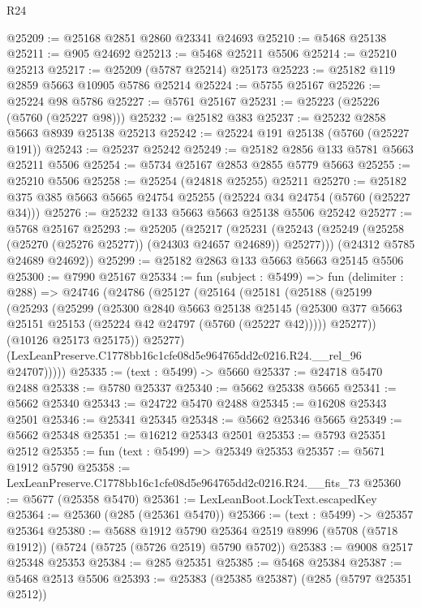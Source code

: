 \begin{lexlean}{R24}
\begin{coremodule}
@25209 := @25168 @2851 @2860 @23341 @24693
@25210 := @5468 @25138
@25211 := @905 @24692
@25213 := @5468 @25211 @5506
@25214 := @25210 @25213
@25217 := @25209 (@5787 @25214) @25173
@25223 := @25182 @119 @2859 @5663 @10905 @5786 @25214
@25224 := @5755 @25167
@25226 := @25224 @98 @5786
@25227 := @5761 @25167
@25231 := @25223 (@25226 (@5760 (@25227 @98)))
@25232 := @25182 @383
@25237 := @25232 @2858 @5663 @8939 @25138 @25213
@25242 := @25224 @191 @25138 (@5760 (@25227 @191))
@25243 := @25237 @25242
@25249 := @25182 @2856 @133 @5781 @5663 @25211 @5506
@25254 := @5734 @25167 @2853 @2855 @5779 @5663
@25255 := @25210 @5506
@25258 := @25254 (@24818 @25255) @25211
@25270 := @25182 @375 @385 @5663 @5665 @24754 @25255 (@25224 @34 @24754 (@5760 (@25227 @34)))
@25276 := @25232 @133 @5663 @5663 @25138 @5506 @25242
@25277 := @5768 @25167
@25293 := @25205
    (@25217
      (@25231 (@25243 (@25249 (@25258 (@25270 (@25276 @25277)) (@24303 @24657 @24689)) @25277)))
      (@24312 @5785 @24689 @24692))
@25299 := @25182 @2863 @133 @5663 @5663 @25145 @5506
@25300 := @7990 @25167
@25334 := fun (subject : @5499) =>
  fun (delimiter : @288) =>
  @24746
    (@24786
      (@25127
        (@25164
          (@25181
            (@25188
              (@25199
                (@25293
                  (@25299
                    (@25300
                      @2840
                      @5663
                      @25138
                      @25145
                      (@25300 @377 @5663 @25151 @25153 (@25224 @42 @24797 (@5760 (@25227 @42)))))
                    @25277))
                (@10126 @25173 @25175))
              @25277)
            (LexLeanPreserve.C1778bb16c1cfe08d5e964765dd2c0216.R24.__rel_96 @24707)))))
@25335 := (text : @5499) -> @5660
@25337 := @24718 @5470 @2488
@25338 := @5780 @25337
@25340 := @5662 @25338 @5665
@25341 := @5662 @25340
@25343 := @24722 @5470 @2488
@25345 := @16208 @25343 @2501
@25346 := @25341 @25345
@25348 := @5662 @25346 @5665
@25349 := @5662 @25348
@25351 := @16212 @25343 @2501
@25353 := @5793 @25351 @2512
@25355 := fun (text : @5499) => @25349 @25353
@25357 := @5671 @1912 @5790
@25358 := LexLeanPreserve.C1778bb16c1cfe08d5e964765dd2c0216.R24.__fits_73
@25360 := @5677 (@25358 @5470)
@25361 := LexLeanBoot.LockText.escapedKey
@25364 := @25360 (@285 (@25361 @5470))
@25366 := (text : @5499) -> @25357 @25364
@25380 := @5688
    @1912
    @5790
    @25364
    @2519
    @8996
    (@5708 (@5718 @1912))
    (@5724 (@5725 (@5726 @2519) @5790 @5702))
@25383 := @9008 @2517 @25348 @25353
@25384 := @285 @25351
@25385 := @5468 @25384
@25387 := @5468 @2513 @5506
@25393 := @25383 (@25385 @25387) (@285 (@5797 @25351 @2512))

\end{coremodule}
\end{lexlean}
